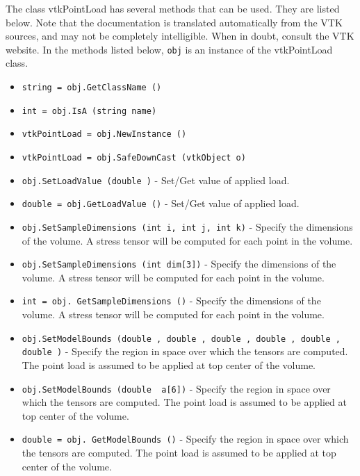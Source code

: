 The class vtkPointLoad has several methods that can be used.
  They are listed below.
Note that the documentation is translated automatically from the VTK sources,
and may not be completely intelligible.  When in doubt, consult the VTK website.
In the methods listed below, \verb|obj| is an instance of the vtkPointLoad class.
\begin{itemize}
\item  \verb|string = obj.GetClassName ()|

\item  \verb|int = obj.IsA (string name)|

\item  \verb|vtkPointLoad = obj.NewInstance ()|

\item  \verb|vtkPointLoad = obj.SafeDownCast (vtkObject o)|

\item  \verb|obj.SetLoadValue (double )| -  Set/Get value of applied load.

\item  \verb|double = obj.GetLoadValue ()| -  Set/Get value of applied load.

\item  \verb|obj.SetSampleDimensions (int i, int j, int k)| -  Specify the dimensions of the volume. A stress tensor will be computed for
 each point in the volume.

\item  \verb|obj.SetSampleDimensions (int dim[3])| -  Specify the dimensions of the volume. A stress tensor will be computed for
 each point in the volume.

\item  \verb|int = obj. GetSampleDimensions ()| -  Specify the dimensions of the volume. A stress tensor will be computed for
 each point in the volume.

\item  \verb|obj.SetModelBounds (double , double , double , double , double , double )| -  Specify the region in space over which the tensors are computed. The point
 load is assumed to be applied at top center of the volume.

\item  \verb|obj.SetModelBounds (double  a[6])| -  Specify the region in space over which the tensors are computed. The point
 load is assumed to be applied at top center of the volume.

\item  \verb|double = obj. GetModelBounds ()| -  Specify the region in space over which the tensors are computed. The point
 load is assumed to be applied at top center of the volume.


\end{itemize}
